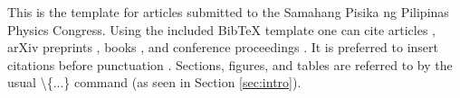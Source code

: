 This is the template for articles submitted to the Samahang Pisika ng Pilipinas Physics Congress. Using the included BibTeX template one can cite articles \cite{articlekey}, arXiv preprints \cite{preprintkey}, books \cite{bookkey}, and conference proceedings \cite{proceedingskey,proceedingskey1,proceedingskey2}. It is preferred to insert citations before punctuation \cite{articlekey,preprintkey}. Sections, figures, and tables are referred to by the usual \textbackslash{}\{...\} command (as seen in Section \ref{sec:intro}).
